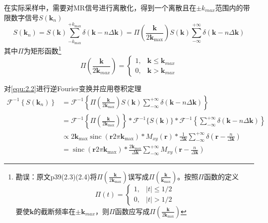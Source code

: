 \documentclass[12pt]{article}
\begin{document}
在实际采样中，需要对MR信号进行离散化，得到一个离散且在$\pm k_{max}$范围内的带限数字信号$S(\bm{k}_n)$
\begin{equation}
    S(\bm{k}_n)=S(\bm{k})\sum_{-k_{\max}}^{+k_{\max}}\delta(\bm{k}-n\Delta\bm{k})=\Pi\left(\frac{\bm{k}}{2\bm{k}_{\max}}\right)S(\bm{k})\sum_{-\infty}^{+\infty}\delta(\bm{k}-n\Delta\bm{k})
    \label{equ:2.2}
\end{equation}
其中$\Pi$为矩形函数\footnote{勘误：原文p39(2.3)(2.4)将$\Pi\left(\frac{\bm{k}}{2\bm{k}_{\max}}\right)$误写成$\Pi\left(\frac{\bm{k}}{\bm{k}_{\max}}\right)$。按照$\Pi$函数的定义
\begin{equation}
    \Pi(t)=
    \begin{cases}
        1, & |t|\leq1/2 \\
        0, & |t|>1/2
    \end{cases}
\end{equation}
要使$\bm{k}$的截断频率在$\pm\bm{k}_{max}$，则$\Pi$函数应写成$\Pi\left(\frac{\bm{k}}{2\bm{k}_{\max}}\right)$}
\begin{equation}
    \Pi\left(\frac{\bm{k}}{2\bm{k}_{max}}\right)=
    \begin{cases}
        1, & \bm{k}\leq\bm{k}_{max} \\
        0, & \bm{k}>\bm{k}_{max}
    \end{cases}
\end{equation}

对\autoref{equ:2.2}进行逆Fourier变换并应用卷积定理
\begin{equation}
    \begin{aligned}
        \mathcal{F}^{-1}\left\{S(\bm{k}_n)\right\}
        &=\mathcal{F}^{-1}\left\{\Pi\left(\frac{\bm{k}}{2\bm{k}_{\max}}\right)S(\bm{k})\sum_{-\infty}^{+\infty}\delta(\bm{k}-n\Delta\bm{k})\right\} \\
        &=\mathcal{F}^{-1}\left\{\Pi\left(\frac{\bm{k}}{2\bm{k}_{\max}}\right)\right\}*\mathcal{F}^{-1}\{S(\bm{k})\}*\mathcal{F}^{-1}\left\{\sum_{-\infty}^{+\infty}\delta(\bm{k}-n\Delta\bm{k})\right\} \\
        &\propto2\bm{k}_{\max}\operatorname{sinc}(\bm{r}2\pi\bm{k}_{\max})*M_{xy}(\bm{r})*\frac{1}{\Delta\bm{k}}\sum_{-\infty}^{+\infty}\delta\left(\bm{r}-\frac{n}{\Delta\bm{k}}\right) \\
        &=\operatorname{sinc}(\bm{r}2\pi\bm{k}_{\max})*\frac{2\bm{k}_{\max}}{\Delta\bm{k}}\sum_{-\infty}^{+\infty}M_{xy}\left(\bm{r}-\frac{n}{\Delta\bm{k}}\right)
    \end{aligned}
    \label{equ:2.4}
\end{equation}
\end{document}
